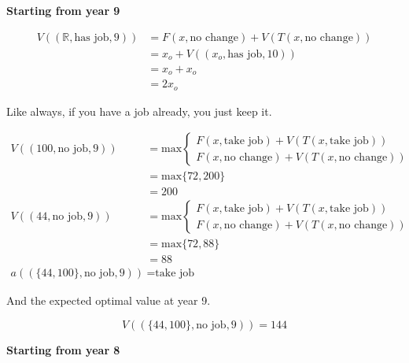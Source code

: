 \documentclass[a4paper, 12pt]{article}
\begin{document}
\textbf{Starting from year 9}

\[
\begin{aligned}
  V((\mathbb{R}, \text{has job}, 9)) &= F(x, \text{no change}) + V(T(x, \text{no change})) \\
                                &= x_{o} + V((x_{o}, \text{has job}, 10)) \\
                                &= x_{o} + x_{o} \\
                                &= 2x_{o}
\end{aligned}
\]

Like always, if you have a job already, you just keep it.

\[
\begin{aligned}
  V((100, \text{no job}, 9)) &= \text{max} \begin{cases}
    F(x, \text{take job}) + V(T(x, \text{take job})) \\
    F(x, \text{no change}) + V(T(x, \text{no change}))
  \end{cases} \\
                             &= \text{max} \{72, 200\} \\
                             &= 200 \\
  V((44, \text{no job}, 9)) &= \text{max} \begin{cases}
    F(x, \text{take job}) + V(T(x, \text{take job})) \\
    F(x, \text{no change}) + V(T(x, \text{no change}))
  \end{cases} \\
                            &= \text{max} \{72, 88\} \\
                            &= 88 \\
  a((\{44, 100\}, \text{no job}, 9)) &= \text{take job}
\end{aligned}
\]

And the expected optimal value at year 9.

\[
  V((\{44, 100\}, \text{no job}, 9)) = 144
\]

\textbf{Starting from year 8}
\end{document}
